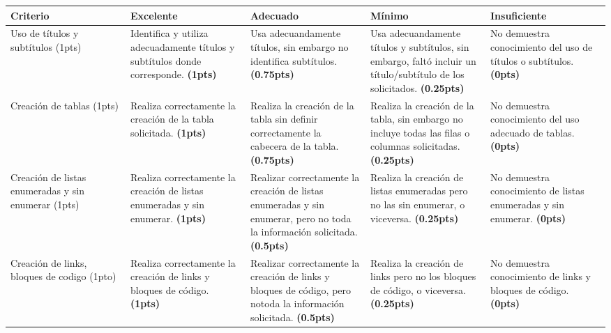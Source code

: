 \documentclass[12pt]{exam}
\begin{document}
\begin{questions}
\begin{table}[h]
{\begin{tabular}{|p{0.2\linewidth}|p{0.2\linewidth}|p{0.2\linewidth}|p{0.2\linewidth}|p{0.2\linewidth}|}
    \hline

    \textbf{Criterio} & 
    \textbf{Excelente} & 
    \textbf{Adecuado } & 
    \textbf{Mínimo} & 
    \textbf{Insuficiente} \\ 
    
    \hline

    Uso de títulos y subtítulos (1pts) &
    Identifica y utiliza adecuadamente títulos y subtítulos donde corresponde. \textbf{(1pts)} &
    Usa adecuandamente títulos, sin embargo no identifica subtítulos. \textbf{(0.75pts)}&
    Usa adecuandamente títulos y subtítulos, sin embargo, faltó incluir un título/subtítulo de los solicitados. \textbf{(0.25pts)}&
    No demuestra conocimiento del uso de títulos o subtítulos. \textbf{(0pts)}\\
    
    \hline

    Creación de tablas (1pts) &
    Realiza correctamente la creación de la tabla solicitada. \textbf{(1pts)}&
    Realiza la creación de la tabla sin definir correctamente la cabecera de la tabla. \textbf{(0.75pts)}&
    Realiza la creación de la tabla, sin embargo no incluye todas las filas o columnas solicitadas. \textbf{(0.25pts)}&
    No demuestra conocimiento del uso adecuado de tablas. \textbf{(0pts)}\\

    \hline

    Creación de listas enumeradas y sin enumerar (1pts) &
    Realiza correctamente la creación de listas enumeradas y sin enumerar. \textbf{(1pts)} &
    Realizar correctamente la creación de listas enumeradas y sin enumerar, pero no toda la información solicitada. \textbf{(0.5pts)} &
    Realiza la creación de listas enumeradas pero no las sin enumerar, o viceversa. \textbf{(0.25pts)} &
    No demuestra conocimiento de listas enumeradas y sin enumerar. \textbf{(0pts)}\\

    \hline

    Creación de links, bloques de codigo (1pto) &
    Realiza correctamente la creación de links y bloques de código. \textbf{(1pts)} &
    Realizar correctamente la creación de links y bloques de código, pero notoda la información solicitada. \textbf{(0.5pts)} &
    Realiza la creación de links pero no los bloques de código, o viceversa. \textbf{(0.25pts)} &
    No demuestra conocimiento de links y bloques de código. \textbf{(0pts)}\\

    \hline


\end{tabular}}
\end{table}
\end{questions}
\end{document}

